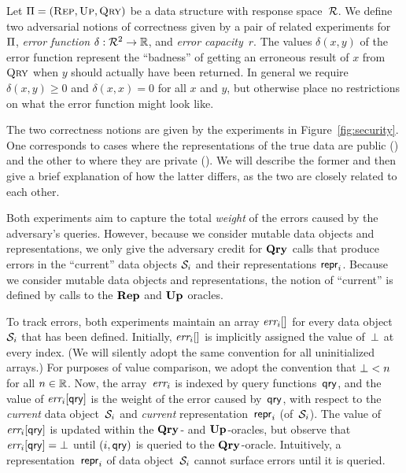 


Let $\mathrm{\Pi}=(\textnormal{\textsc{Rep}},\textnormal{\textsc{Up}},\textnormal{\textsc{Qry}})$ be a data structure with response space~$\mathcal{R}$.
%
We define two adversarial notions of correctness given by a pair of related
experiments for~$\mathrm{\Pi}$, \emph{error function} $\delta:\mathcal{R}^2 \to \mathbb{R}$,
and \emph{error capacity}~$r$. The values $\delta(x,y)$ of the error function
represent the ``badness'' of getting an erroneous result of $x$ from $\textnormal{\textsc{Qry}}$ when
$y$ should actually have been returned. In general we require
$\delta(x,y) \geq 0$ and $\delta(x,x) = 0$ for all $x$ and $y$, but otherwise
place no restrictions on what the error function might look like.

The two correctness notions are given by the experiments in
Figure~\ref{fig:security}. One corresponds to cases where the representations of
the true data are public (\errep) and the other to where they are private
(\erreps). We will describe the former and then give a brief explanation of how
the latter differs, as the two are closely related to each other.

Both experiments aim to capture the total \emph{weight} of the errors caused by
the adversary's queries. However, because we consider mutable data objects and
representations, we only give the adversary credit for $\textup{\textbf{Qry}}\hspace{0.5pt}$ calls that
produce errors in the ``current'' data objects $\mathcal{S}_i$ and their
representations $\mathsf{repr}_i$. Because we consider mutable data objects and
representations, the notion of ``current'' is defined by calls to the $\textup{\textbf{Rep}}\hspace{0.5pt}$
and $\textup{\textbf{Up}}\hspace{0.5pt}$ oracles.

To track errors, both experiments maintain an array $\textit{err}_i[]$ for every data
object~$\mathcal{S}_i$ that has been defined.  Initially, $\textit{err}_i[]$ is implicitly
assigned the value of~$\bot$ at every index. (We will silently adopt the
same convention for all uninitialized arrays.) For purposes of value
comparison, we adopt the convention that $\bot < n$ for all $n \in \mathbb{R}$.
%
Now, the array~$\textit{err}_i$ is indexed by query functions~$\mathsf{qry}$, and the value of
$\textit{err}_i[\mathsf{qry}]$ is the weight of the error caused by~$\mathsf{qry}$, with respect to
the \emph{current} data object~$\mathcal{S}_i$ and \emph{current}
representation~$\mathsf{repr}_i$ (of~$\mathcal{S}_i$).
%
The value of~$\textit{err}_i[\mathsf{qry}]$ is updated within the $\textup{\textbf{Qry}}\hspace{0.5pt}$- and $\textup{\textbf{Up}}\hspace{0.5pt}$-oracles,
but observe that $\textit{err}_i[\mathsf{qry}] = \bot$ until $(i,\mathsf{qry})$ is queried to the
$\textup{\textbf{Qry}}\hspace{0.5pt}$-oracle.  Intuitively, a representation~$\mathsf{repr}_i$ of data object~$\mathcal{S}_i$
cannot surface errors until it is queried.

